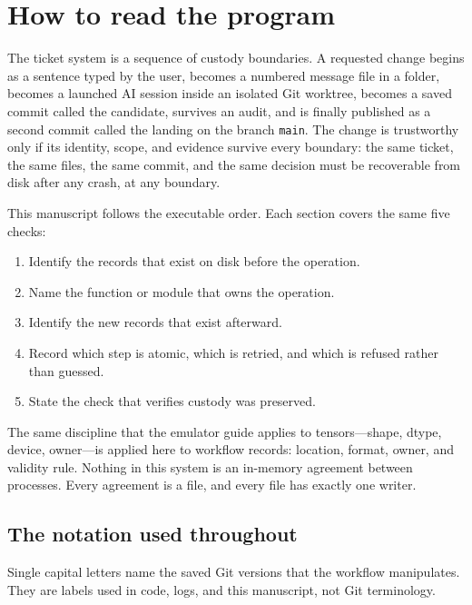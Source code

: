 \documentclass[10pt,aps,prd,twocolumn,nofootinbib]{revtex4-2}
\newcommand{\code}[1]{\texttt{#1}}
\begin{document}
\section{How to read the program}
\label{sec:reader-map}

The ticket system is a sequence of custody boundaries.  A requested
change begins as a sentence typed by the user, becomes a numbered
message file in a folder, becomes a launched AI session inside an
isolated Git worktree, becomes a saved commit called the candidate,
survives an audit, and is finally published as a second commit called
the landing on the branch \code{main}.  The change is trustworthy only
if its identity, scope, and evidence survive every boundary: the same
ticket, the same files, the same commit, and the same decision must be
recoverable from disk after any crash, at any boundary.

This manuscript follows the executable order.  Each section covers the
same five checks:
\begin{enumerate}
  \item Identify the records that exist on disk before the operation.
  \item Name the function or module that owns the operation.
  \item Identify the new records that exist afterward.
  \item Record which step is atomic, which is retried, and which is
        refused rather than guessed.
  \item State the check that verifies custody was preserved.
\end{enumerate}

The same discipline that the emulator guide applies to tensors---shape,
dtype, device, owner---is applied here to workflow records: location,
format, owner, and validity rule.  Nothing in this system is an
in-memory agreement between processes.  Every agreement is a file, and
every file has exactly one writer.

\subsection{The notation used throughout}
\label{sec:notation}

Single capital letters name the saved Git versions that the workflow
manipulates.  They are labels used in code, logs, and this manuscript,
not Git terminology.
\end{document}
